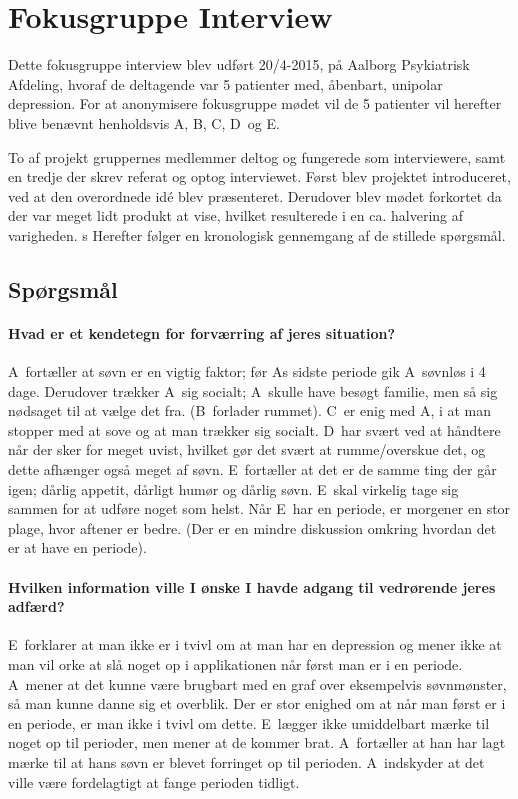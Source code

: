 \newcommand{\pa}{A}
\newcommand{\pb}{B}
\newcommand{\pc}{C}
\newcommand{\pd}{D}
\newcommand{\pe}{E}

\section{Fokusgruppe Interview}
Dette fokusgruppe interview blev udført 20/4-2015, på Aalborg Psykiatrisk Afdeling, hvoraf de deltagende var 5 patienter med, åbenbart, unipolar depression.
For at anonymisere fokusgruppe mødet vil de 5 patienter vil herefter blive benævnt henholdsvis \pa, \pb, \pc, \pd~og \pe.

To af projekt gruppernes medlemmer deltog og fungerede som interviewere, samt en tredje der skrev referat og optog interviewet.
Først blev projektet introduceret, ved at den overordnede idé blev præsenteret.
Derudover blev mødet forkortet da der var meget lidt produkt at vise, hvilket resulterede i en ca. halvering af varigheden.
s
Herefter følger en kronologisk gennemgang af de stillede spørgsmål.

\subsection{Spørgsmål}

\paragraph{Hvad er et kendetegn for forværring af jeres situation?}
\pa~fortæller at søvn er en vigtig faktor; før \pa s sidste periode gik \pa~søvnløs i 4 dage.
Derudover trækker \pa~sig socialt; \pa~skulle have besøgt familie, men så sig nødsaget til at vælge det fra.
(\pb~forlader rummet).
\pc~er enig med \pa, i at man stopper med at sove og at man trækker sig socialt.
\pd~har svært ved at håndtere når der sker for meget uvist, hvilket gør det svært at rumme/overskue det, og dette afhænger også meget af søvn.
\pe~fortæller at det er de samme ting der går igen; dårlig appetit, dårligt humør og dårlig søvn.
\pe~skal virkelig tage sig sammen for at udføre noget som helst.
Når \pe~har en periode, er morgener en stor plage, hvor aftener er bedre.
(Der er en mindre diskussion omkring hvordan det er at have en periode).

\paragraph{Hvilken information ville I ønske I havde adgang til vedrørende jeres adfærd?}
\pe~forklarer at man ikke er i tvivl om at man har en depression og mener ikke at man vil orke at slå noget op i applikationen når først man er i en periode.
\pa~mener at det kunne være brugbart med en graf over eksempelvis søvnmønster, så man kunne danne sig et overblik.
Der er stor enighed om at når man først er i en periode, er man ikke i tvivl om dette.
\pe~lægger ikke umiddelbart mærke til noget op til perioder, men mener at de kommer brat.
\pa~fortæller at han har lagt mærke til at hans søvn er blevet forringet op til perioden.
\pa~indskyder at det ville være fordelagtigt at fange perioden tidligt.


